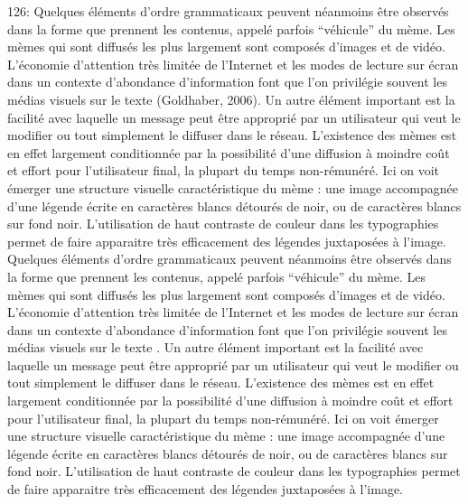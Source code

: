 126: Quelques \'el\'ements d{\textquoteright}ordre grammaticaux peuvent n\'eanmoins \^etre observ\'es dans la forme que prennent les contenus, appel\'e parfois {\textquotedblleft}v\'ehicule{\textquotedblright} du m\`eme. Les m\`emes qui sont diffus\'es les plus largement sont compos\'es d{\textquoteright}images et de vid\'eo. L{\textquoteright}\'economie d{\textquoteright}attention tr\`es limit\'ee de l{\textquoteright}Internet et les modes de lecture sur \'ecran dans un contexte d{\textquoteright}abondance d{\textquoteright}information font que l{\textquoteright}on privil\'egie souvent les m\'edias visuels sur le texte (Goldhaber, 2006). Un autre \'el\'ement important est la facilit\'e avec laquelle un message peut \^etre appropri\'e par un utilisateur qui veut le modifier ou tout simplement le diffuser dans le r\'eseau. L{\textquoteright}existence des m\`emes est en effet largement conditionn\'ee par la possibilit\'e d{\textquoteright}une diffusion \`a moindre co\^ut et effort pour l{\textquoteright}utilisateur final, la plupart du temps non-r\'emun\'er\'e. Ici on voit \'emerger une structure visuelle caract\'eristique du m\`eme : une image accompagn\'ee d{\textquoteright}une l\'egende \'ecrite en caract\`eres blancs d\'etour\'es de noir, ou de caract\`eres blancs sur fond noir. L{\textquoteright}utilisation de haut contraste de couleur dans les typographies permet de faire apparaitre tr\`es efficacement des l\'egendes juxtapos\'ees \`a l{\textquoteright}image.
Quelques \'el\'ements d{\textquoteright}ordre grammaticaux peuvent n\'eanmoins \^etre observ\'es dans la forme que prennent les contenus, appel\'e parfois {\textquotedblleft}v\'ehicule{\textquotedblright} du m\`eme. Les m\`emes qui sont diffus\'es les plus largement sont compos\'es d{\textquoteright}images et de vid\'eo. L{\textquoteright}\'economie d{\textquoteright}attention tr\`es limit\'ee de l{\textquoteright}Internet et les modes de lecture sur \'ecran dans un contexte d{\textquoteright}abondance d{\textquoteright}information font que l{\textquoteright}on privil\'egie souvent les m\'edias visuels sur le texte \cite{Goldhaber2006}. Un autre \'el\'ement important est la facilit\'e avec laquelle un message peut \^etre appropri\'e par un utilisateur qui veut le modifier ou tout simplement le diffuser dans le r\'eseau. L{\textquoteright}existence des m\`emes est en effet largement conditionn\'ee par la possibilit\'e d{\textquoteright}une diffusion \`a moindre co\^ut et effort pour l{\textquoteright}utilisateur final, la plupart du temps non-r\'emun\'er\'e. Ici on voit \'emerger une structure visuelle caract\'eristique du m\`eme : une image accompagn\'ee d{\textquoteright}une l\'egende \'ecrite en caract\`eres blancs d\'etour\'es de noir, ou de caract\`eres blancs sur fond noir. L{\textquoteright}utilisation de haut contraste de couleur dans les typographies permet de faire apparaitre tr\`es efficacement des l\'egendes juxtapos\'ees \`a l{\textquoteright}image.
